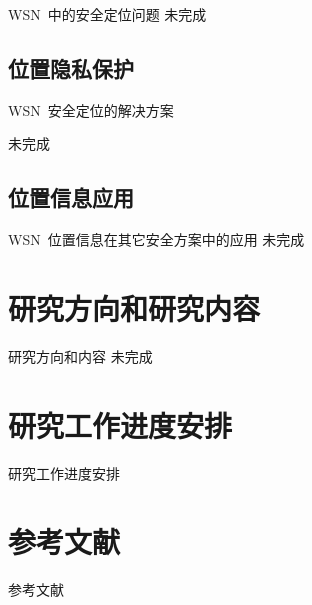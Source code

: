 \documentclass[mathserif,compress,CJKutf8, red]{beamer}
\begin{document}
\begin{CJK*}{UTF8}{song}
\begin{frame}{WSN~中的安全定位问题}
未完成\cite{Capkun2006}
\end{frame}

\subsection{位置隐私保护}

\begin{frame}{WSN~安全定位的解决方案}

未完成
\end{frame}

\subsection{位置信息应用}

\begin{frame}{WSN~位置信息在其它安全方案中的应用}
未完成
\end{frame}

\section{研究方向和研究内容}

\begin{frame}{研究方向和内容}
未完成
\end{frame}

\section{研究工作进度安排}

\begin{frame}{研究工作进度安排}
\end{frame}

\section{参考文献}

\begin{frame}{参考文献}
\footnotesize



\end{frame}
\end{CJK*}
\end{document}
